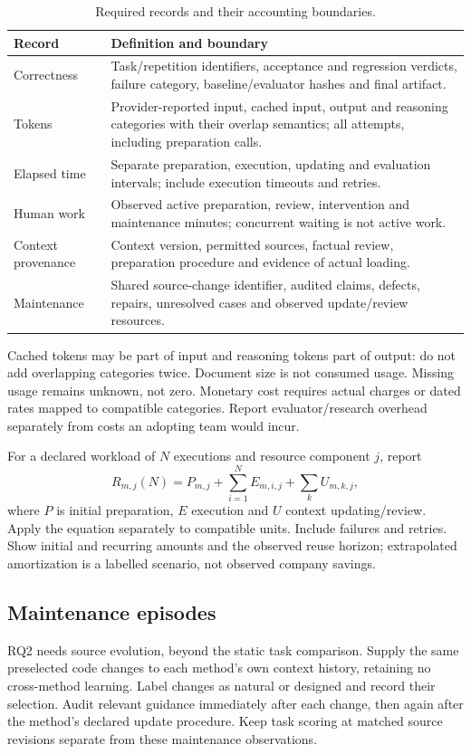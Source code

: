 \begin{table}[htbp]
\centering\small
\caption{Required records and their accounting boundaries.}
\label{tab:measurements}
\begin{tabularx}{\textwidth}{@{}p{}Y@{}}
\toprule
Record & Definition and boundary \\
\midrule
Correctness & Task/repetition identifiers, acceptance and regression verdicts, failure category, baseline/evaluator hashes and final artifact. \\
\addlinespace
Tokens & Provider-reported input, cached input, output and reasoning categories with their overlap semantics; all attempts, including preparation calls. \\
\addlinespace
Elapsed time & Separate preparation, execution, updating and evaluation intervals; include execution timeouts and retries. \\
\addlinespace
Human work & Observed active preparation, review, intervention and maintenance minutes; concurrent waiting is not active work. \\
\addlinespace
Context provenance & Context version, permitted sources, factual review, preparation procedure and evidence of actual loading. \\
\addlinespace
Maintenance & Shared source-change identifier, audited claims, defects, repairs, unresolved cases and observed update/review resources. \\
\bottomrule
\end{tabularx}
\end{table}

Cached tokens may be part of input and reasoning tokens part of output: do not
add overlapping categories twice. Document size is not consumed usage. Missing
usage remains unknown, not zero. Monetary cost requires actual charges or dated
rates mapped to compatible categories. Report evaluator/research overhead
separately from costs an adopting team would incur.

For a declared workload of $N$ executions and resource component $j$, report
\[
 R_{m,j}(N)=P_{m,j}+\sum_{i=1}^{N}E_{m,i,j}+\sum_k U_{m,k,j},
\]
where $P$ is initial preparation, $E$ execution and $U$ context updating/review.
Apply the equation separately to compatible units. Include failures and retries.
Show initial and recurring amounts and the observed reuse horizon; extrapolated
amortization is a labelled scenario, not observed company savings.

\subsection{Maintenance episodes}
RQ2 needs source evolution, beyond the static task comparison. Supply the same
preselected code changes to each method's own context history, retaining no
cross-method learning. Label changes as natural or designed and record their
selection. Audit relevant guidance immediately after each change, then again
after the method's declared update procedure. Keep task scoring at matched
source revisions separate from these maintenance observations.

